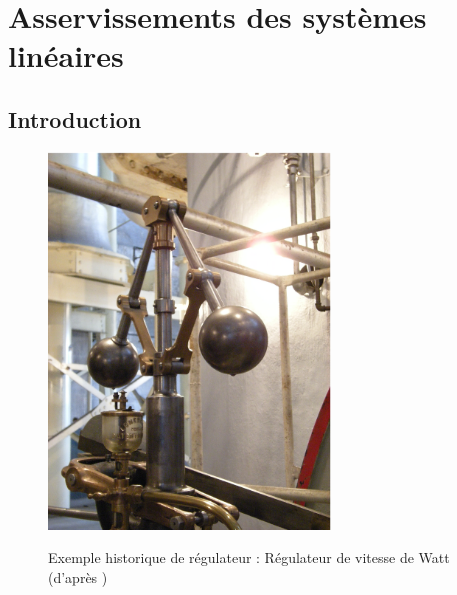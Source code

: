 \chapter{Asservissements des systèmes linéaires\label{chap-asservis}}

\minitoc
\newpage
\section{Introduction}

\begin{figure}[!h]
    \centering
   \includegraphics[width=0.45\linewidth,height=10cm]{fig/Georgetown_PowerPlant_Museum_m.eps}
    \label{fig-watt}
\caption{Exemple historique de régulateur : Régulateur de vitesse de Watt (d'après \cite{watt})\label{fig-hist}}
\end{figure}

